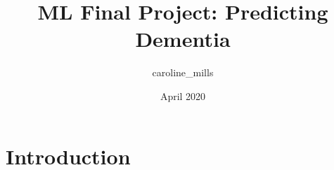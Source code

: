 \documentclass{article}
\title{ML Final Project: Predicting Dementia}
\author{caroline_mills }
\date{April 2020}
\begin{document}
\maketitle

\section{Introduction}
\end{document}

